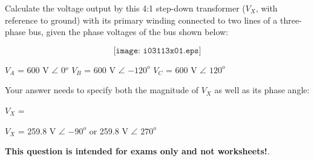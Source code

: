 

Calculate the voltage output by this 4:1 step-down transformer ($V_X$, with reference to ground) with its primary winding connected to two lines of a three-phase bus, given the phase voltages of the bus shown below:

$$\texttt{[image: i03113x01.eps]}$$

$V_A$ = 600 V $\angle$ 0$^{o}$ \hskip 20pt $V_B$ = 600 V $\angle$ $-120^{o}$ \hskip 20pt $V_C$ = 600 V $\angle$ $120^{o}$

\vskip 10pt

Your answer needs to specify both the magnitude of $V_X$ as well as its phase angle:

\vskip 10pt

$V_X$ = \underbar{\hskip 80pt} 







$V_X$ = 259.8 V $\angle$ $-90^o$ \hskip 10pt or \hskip 10pt 259.8 V $\angle$ $270^o$
 






{\bf This question is intended for exams only and not worksheets!}.




